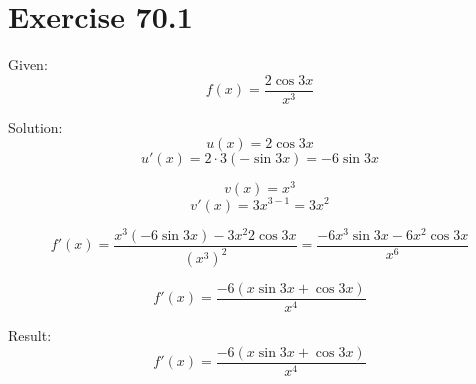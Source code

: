 \documentclass[a4paper, 10pt]{scrartcl}
\begin{document}
\section{Exercise 70.1}

Given:
\[f(x) = \frac{2\cos{3x}}{x^{3}}\]

Solution:
\[u(x) = 2\cos{3x}\]
\[u'(x) = 2\cdot3(-\sin{3x}) = -6\sin{3x}\]

\[v(x) = x^{3}\]
\[v'(x) = 3x^{3 - 1} = 3x^{2}\]

\[f'(x) = \frac{x^{3}(-6\sin{3x}) - 3x^{2}2\cos{3x}}{(x^{3})^{2}} =
         \frac{-6x^{3}\sin{3x} - 6x^{2}\cos{3x}}{x^{6}}\]

\[f'(x) = \frac{-6(x\sin{3x} + \cos{3x})}{x^{4}}\]

Result:
\[f'(x) = \frac{-6(x\sin{3x} + \cos{3x})}{x^{4}}\]
\end{document}
